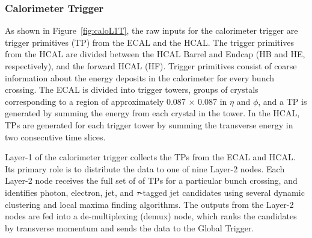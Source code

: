 
\subsubsection{Calorimeter Trigger}
As shown in Figure~\ref{fig:caloL1T}, the raw inputs for the calorimeter trigger are trigger primitives (TP) from the ECAL and the HCAL. The trigger primitives from the HCAL are divided between the HCAL Barrel and Endcap (HB and HE, respectively), and the forward HCAL (HF). Trigger primitives consist of coarse information about the energy deposits  in the calorimeter for every bunch crossing. The ECAL is divided into trigger towers, groups of crystals corresponding to a region of approximately 0.087 $\times$ 0.087 in $\eta$ and $\phi$, and a TP is generated by summing the energy from each crystal in the tower. In the HCAL, TPs are generated for each trigger tower by summing the transverse energy in two consecutive time slices. 

Layer-1 of the calorimeter trigger collects the TPs from the ECAL and HCAL. Its primary role is to distribute the data to one of nine Layer-2 nodes. Each Layer-2 node receives the full set of of TPs for a particular bunch crossing, and identifies photon, electron, jet, and $\tau$-tagged jet candidates using several dynamic clustering and local maxima finding algorithms. The outputs from the Layer-2 nodes are fed into a de-multiplexing (demux) node, which ranks the candidates by transverse momentum and sends the data to the Global Trigger. 


